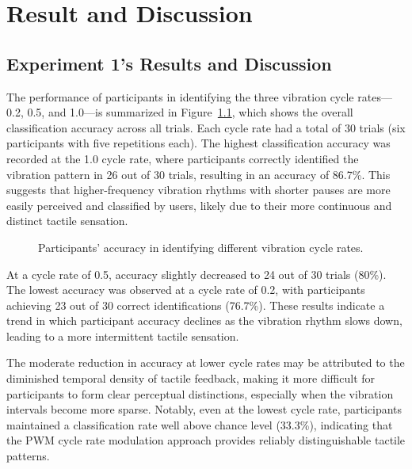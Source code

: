 \chapter{Result and Discussion} %

\label{Chapter5} %


\section{Experiment 1's Results and Discussion}
The performance of participants in identifying the three vibration cycle rates—0.2, 0.5, and 1.0—is summarized in Figure~\ref{fig:ex1_results}, which shows the overall classification accuracy across all trials. Each cycle rate had a total of 30 trials (six participants with five repetitions each). The highest classification accuracy was recorded at the 1.0 cycle rate, where participants correctly identified the vibration pattern in 26 out of 30 trials, resulting in an accuracy of 86.7\%. This suggests that higher-frequency vibration rhythms with shorter pauses are more easily perceived and classified by users, likely due to their more continuous and distinct tactile sensation.

\begin{figure}[H]\centering
	
	\caption{Participants' accuracy in identifying different vibration cycle rates.}\label{fig:ex1_results}
\end{figure}


At a cycle rate of 0.5, accuracy slightly decreased to 24 out of 30 trials (80\%). The lowest accuracy was observed at a cycle rate of 0.2, with participants achieving 23 out of 30 correct identifications (76.7\%). These results indicate a trend in which participant accuracy declines as the vibration rhythm slows down, leading to a more intermittent tactile sensation. %

The moderate reduction in accuracy at lower cycle rates may be attributed to the diminished temporal density of tactile feedback, making it more difficult for participants to form clear perceptual distinctions, especially when the vibration intervals become more sparse. Notably, even at the lowest cycle rate, participants maintained a classification rate well above chance level (33.3\%), indicating that the PWM cycle rate modulation approach provides reliably distinguishable tactile patterns.

